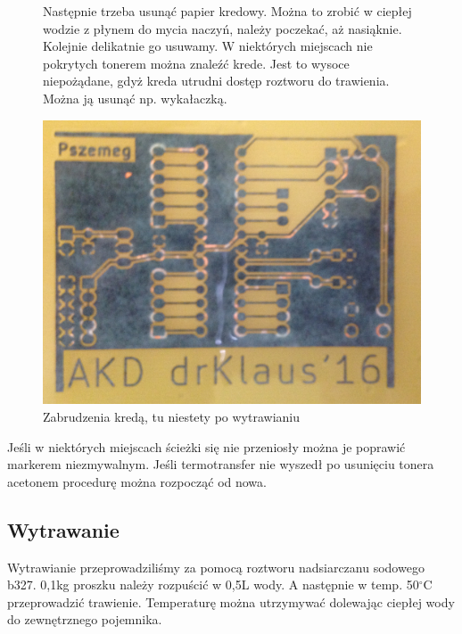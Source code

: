 \documentclass[a4paper,11pt]{article}
\def\SCALE{0.6}
\begin{document}
\begin{figure}[H]
Następnie trzeba usunąć papier kredowy. Można to zrobić w ciepłej wodzie z płynem do mycia naczyń, należy poczekać, aż nasiąknie. Kolejnie delikatnie go usuwamy. W niektórych miejscach nie pokrytych tonerem można znaleźć krede. Jest to wysoce niepożądane, gdyż kreda utrudni dostęp roztworu do trawienia. Można ją usunąć np. wykałaczką.

	\centering
	\includegraphics[width=\SCALE
	\paperwidth]{ZabrudzeniaKreda}
	\caption{Zabrudzenia kredą, tu niestety po wytrawianiu}
\end{figure}


Jeśli w niektórych miejscach ścieżki się nie przeniosły można je poprawić markerem niezmywalnym.
Jeśli termotransfer nie wyszedł po usunięciu tonera acetonem procedurę można rozpocząć od nowa.
\subsection{Wytrawanie}

Wytrawianie przeprowadziliśmy za pomocą roztworu nadsiarczanu sodowego b327. 0,1kg proszku należy rozpuścić w 0,5L wody. A następnie w temp. 50$^\circ$C przeprowadzić trawienie. Temperaturę można utrzymywać dolewając ciepłej wody do zewnętrznego pojemnika.
\end{document}
